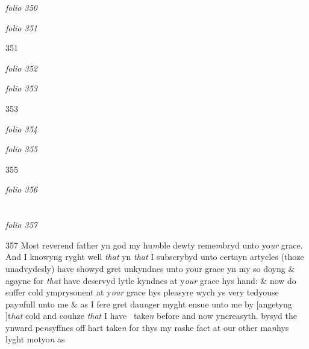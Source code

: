 \documentclass[12pt, a4paper]{book}
\begin{document}
\dotfill
					

\textit{folio 350}


         \vspace{4cm}
         
\dotfill
					

\textit{folio 351}


{\color{Mahogany}351}

\dotfill
					

\textit{folio 352}


         \vspace{4cm}
         
\dotfill
					

\textit{folio 353}


{\color{Mahogany}353}

\dotfill
					

\textit{folio 354}


         \vspace{4cm}
         
\dotfill
					

\textit{folio 355}


{\color{Mahogany}355}

\dotfill
					

\textit{folio 356}


         \vspace{4cm}
         
\dotfill
					  \section*{}

\textit{folio 357}



{\color{Mahogany}357} Most reverend father yn god my hu\textit{m}ble dewty reme\textit{m}bryd unto yo\textit{ur}  grace. And I knowyng ryght well \textit{that} yn \textit{that} I subscrybyd unto certayn artycles (thoze unadvydesly) have showyd gret unkyndnes unto your grace yn my so doyng \& agayne for \textit{that} have deservyd lytle kyndnes at y\textit{our} grace hys hand: \& now do suffer cold ymprysonent at y\textit{our} grace hys pleasyre wych ys very tedyouse pay\textit{n}full unto me \& as I fere gret dau\textit{n}ger myght ensue unto me by [angetyng ]t\textit{hat} cold and couhze \textit{that} I have  take\textit{n} before and now yncreasyth. bysyd the ynward pe\textit{n}syffnes off hart take\textit{n} for thys my rashe fact at our other ma\textit{n}hys lyght motyo\textit{n}
               as 
			
\end{document}
